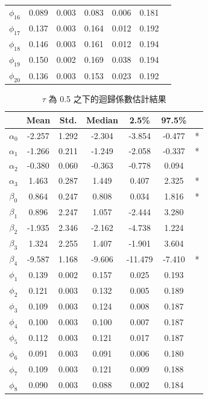 \documentclass[12pt,a4paper]{article}
\begin{document}
\begin{CJK}{UTF8}{bkai}
\begin{table}
\begin{tabular}{ccccccc}
$\phi_{16}$ & 0.089 & 0.003 & 0.083 & 0.006 & 0.181 & \\
$\phi_{17}$ & 0.137 & 0.003 & 0.164 & 0.012 & 0.192 & \\
$\phi_{18}$ & 0.146 & 0.003 & 0.161 & 0.012 & 0.194 & \\
$\phi_{19}$ & 0.150 & 0.002 & 0.169 & 0.038 & 0.194 & \\
$\phi_{20}$ & 0.136 & 0.003 & 0.153 & 0.023 & 0.192 & \\
\hline
\end{tabular}
\label{tab:4}
\end{table}
\noindent
\begin{table}
\centering
\setlength{\belowcaptionskip}{0.5cm}
\caption{$\tau$ 為 0.5 之下的迴歸係數估計結果}
\begin{tabular}{ccccccc}
\hline
& Mean & Std.& Median & 2.5\% & 97.5\% &\\
\hline
$\alpha_0$ & -2.257 & 1.292 & -2.304 & -3.854 & -0.477 & *\\
$\alpha_1$ & -1.266 & 0.211 & -1.249 & -2.058 & -0.337 & *\\
$\alpha_2$ & -0.380 & 0.060 & -0.363 & -0.778 &  0.094 &  \\
$\alpha_3$ &  1.463 & 0.287 &  1.449 &  0.407 &  2.325 & *\\
$\beta_0$  &  0.864 & 0.247 &  0.808 &  0.034 &  1.816 & *\\
$\beta_1$  &  0.896 & 2.247 &  1.057 & -2.444 &  3.280 &  \\
$\beta_2$  & -1.935 & 2.346 & -2.162 & -4.738 &  1.224 &  \\
$\beta_3$  &  1.324 & 2.255 &  1.407 & -1.901 &  3.604 &  \\
$\beta_4$  & -9.587 & 1.168 & -9.606 &-11.479 & -7.410 & *\\
\hline
$ \phi_1$   & 0.139 & 0.002 & 0.157 & 0.025 & 0.193 & \\
$ \phi_2$   & 0.121 & 0.003 & 0.132 & 0.005 & 0.189 & \\
$ \phi_3$   & 0.109 & 0.003 & 0.124 & 0.008 & 0.187 & \\
$ \phi_4$   & 0.100 & 0.003 & 0.100 & 0.007 & 0.187 & \\
$ \phi_5$   & 0.112 & 0.003 & 0.121 & 0.017 & 0.187 & \\
$ \phi_6$   & 0.091 & 0.003 & 0.091 & 0.006 & 0.180 & \\
$ \phi_7$   & 0.109 & 0.003 & 0.121 & 0.009 & 0.188 & \\
$ \phi_8$   & 0.090 & 0.003 & 0.088 & 0.002 & 0.184 & \\

\end{tabular}
\end{table}
\end{CJK}
\end{document}
